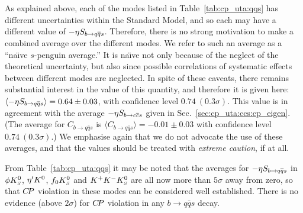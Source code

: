 As explained above,
each of the modes listed in Table~\ref{tab:cp_uta:qqs} has
different uncertainties within the Standard Model,
and so each may have a different value of $-\etacp S_{b \to q\bar q s}$.
Therefore, there is no strong motivation to make a combined average
over the different modes.
We refer to such an average as a ``na\"\i ve $s$-penguin average.''
It is na\"\i ve not only because of the neglect of the theoretical uncertainty,
but also since possible correlations of systematic effects 
between different modes are neglected.
In spite of these caveats, there remains substantial interest 
in the value of this quantity,
and therefore it is given here:
$\langle -\etacp S_{b \to q\bar q s} \rangle = 0.64 \pm 0.03$,
with confidence level $0.74~(0.3\sigma)$.
This value is in agreement with the average 
$-\etacp S_{b \to c\bar c s}$ given in Sec.~\ref{sec:cp_uta:ccs:cp_eigen}.
%
(The average for $C_{b \to q\bar q s}$ is 
$\langle C_{b \to q\bar q s} \rangle = -0.01 \pm 0.03$
with confidence level $0.74~(0.3\sigma)$.)
%
We emphasise again that we do not advocate the use of these averages,
and that the values should be treated with {\it extreme caution}, if at all.

From Table~\ref{tab:cp_uta:qqs} it may be noted 
that the averages for $-\etacp S_{b \to q\bar q s}$ in 
$\phi K^0_{\scriptscriptstyle S}$, ${\eta^{\prime}} K^0$, $f_0K^0_{\scriptscriptstyle S}$ and $K^+K^-K^0_{\scriptscriptstyle S}$
are all now more than $5\sigma$ away from zero, 
so that $C\!P$ violation in these modes can be considered well established.
There is no evidence (above $2\sigma$) for $C\!P$ violation in any $b \to q \bar q s$ decay.

